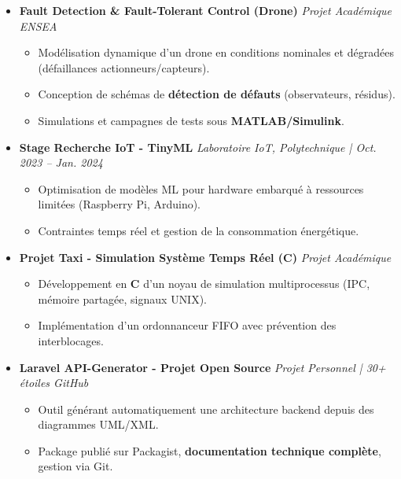 \documentclass[a4paper,11pt]{article}
\begin{document}
\begin{itemize}[leftmargin=*, label={-}]
\item \textbf{Fault Detection \& Fault-Tolerant Control (Drone)} \hfill \textit{Projet Académique ENSEA}
\vspace{-2pt}
    \begin{itemize}[leftmargin=0.4cm, nosep, label=\tiny$\bullet$]
        \item \small{Modélisation dynamique d'un drone en conditions nominales et dégradées (défaillances actionneurs/capteurs).}
        \item \small{Conception de schémas de \textbf{détection de défauts} (observateurs, résidus).}
        \item \small{Simulations et campagnes de tests sous \textbf{MATLAB/Simulink}.}
    \end{itemize}
    \vspace{2pt}

\item \textbf{Stage Recherche IoT - TinyML} \hfill \textit{Laboratoire IoT, Polytechnique | Oct. 2023 -- Jan. 2024}
\vspace{-2pt}
    \begin{itemize}[leftmargin=0.4cm, nosep, label=\tiny$\bullet$]
        \item \small{Optimisation de modèles ML pour hardware embarqué à ressources limitées (Raspberry Pi, Arduino).}
        \item \small{Contraintes temps réel et gestion de la consommation énergétique.}
    \end{itemize}
    \vspace{2pt}

\item \textbf{Projet Taxi - Simulation Système Temps Réel (C)} \hfill \textit{Projet Académique}
\vspace{-2pt}
    \begin{itemize}[leftmargin=0.4cm, nosep, label=\tiny$\bullet$]
        \item \small{Développement en \textbf{C} d'un noyau de simulation multiprocessus (IPC, mémoire partagée, signaux UNIX).}
        \item \small{Implémentation d'un ordonnanceur FIFO avec prévention des interblocages.}
    \end{itemize}
    \vspace{2pt}

\item \textbf{Laravel API-Generator - Projet Open Source} \hfill \textit{Projet Personnel | 30+ étoiles GitHub}
\vspace{-2pt}
    \begin{itemize}[leftmargin=0.4cm, nosep, label=\tiny$\bullet$]
        \item \small{Outil générant automatiquement une architecture backend depuis des diagrammes UML/XML.}
        \item \small{Package publié sur Packagist, \textbf{documentation technique complète}, gestion via Git.}
    \end{itemize}

\end{itemize}
\end{document}
